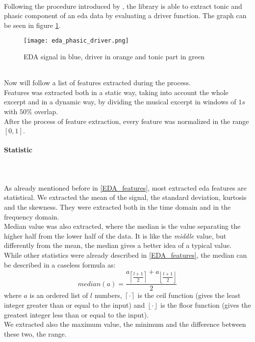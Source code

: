 \\
Following the procedure introduced by \cite{bizzego2019pyphysio}, the library is able to extract tonic and phasic component of an \gls{eda} data by evaluating a driver function. The graph can be seen in figure \ref{fig:eda_phasic_driver}.
\begin{figure}[h]
    \centering
    \texttt{[image: eda\_phasic\_driver.png]} 
	\caption{EDA signal in blue, driver in orange and tonic part in green}
    \label{fig:eda_phasic_driver}
\end{figure}
\\
Now will follow a list of features extracted during the process.
\\
Features was extracted both in a static way, taking into account the whole excerpt and in a dynamic way, by dividing the musical excerpt in windows of $1s$ with $50\%$ overlap.
\\
After the process of feature extraction, every feature was normalized in the range $[0,1]$.

\paragraph{Statistic}
\mbox{} \\ \\
As already mentioned before in \ref{EDA_features}, most extracted \gls{eda} features are statistical. We extracted the mean of the signal, the standard deviation, kurtosis and the skewness. They were extracted both in the time domain and in the frequency domain.
\\ \indent
Median value was also extracted, where the median is the value separating the higher half from the lower half of the data. It is like the \textit{middle} value, but differently from the mean, the median gives a better idea of a typical value.
\\
While other statistics were already described in \ref{EDA_features}, the median can be described in a caseless formula as:
\begin{equation}
	median(a)=\dfrac{a_{\left \lceil{\dfrac{l+1}{2}}\right \rceil}+a_{\left \lfloor{\dfrac{l+1}{2}}\right \rfloor}}{2}
\end{equation}
where $a$ is an ordered list of $l$ numbers, $\left \lceil {\cdot} \right \rceil$ is the ceil function (gives the least integer greater than or equal to the input) and $\left \lfloor {\cdot} \right \rfloor$ is the floor function (gives the greatest integer less than or equal to the input).
\\ \indent
We extracted also the maximum value, the minimum and the difference between these two, the range.

